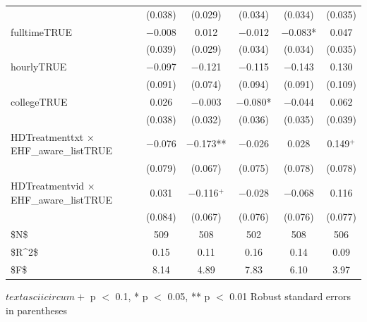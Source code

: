 \documentclass[
  11pt,
  oneside]{article}
\begin{document}
\begin{table}
\begin{threeparttable}
\begin{tabular}[t]{lccccc}
 & (\num{0.038}) & (\num{0.029}) & (\num{0.034}) & (\num{0.034}) & (\num{0.035})\\
fulltimeTRUE & \num{-0.008} & \num{0.012} & \num{-0.012} & \num{-0.083}* & \num{0.047}\\
 & (\num{0.039}) & (\num{0.029}) & (\num{0.034}) & (\num{0.034}) & (\num{0.035})\\
hourlyTRUE & \num{-0.097} & \num{-0.121} & \num{-0.115} & \num{-0.143} & \num{0.130}\\
 & (\num{0.091}) & (\num{0.074}) & (\num{0.094}) & (\num{0.091}) & (\num{0.109})\\
collegeTRUE & \num{0.026} & \num{-0.003} & \num{-0.080}* & \num{-0.044} & \num{0.062}\\
 & (\num{0.038}) & (\num{0.032}) & (\num{0.036}) & (\num{0.035}) & (\num{0.039})\\
HDTreatmenttxt × EHF\_aware\_listTRUE & \num{-0.076} & \num{-0.173}** & \num{-0.026} & \num{0.028} & \num{0.149}$^+$\\
 & (\num{0.079}) & (\num{0.067}) & (\num{0.075}) & (\num{0.078}) & (\num{0.078})\\
HDTreatmentvid × EHF\_aware\_listTRUE & \num{0.031} & \num{-0.116}$^+$ & \num{-0.028} & \num{-0.068} & \num{0.116}\\
 & (\num{0.084}) & (\num{0.067}) & (\num{0.076}) & (\num{0.076}) & (\num{0.077})\\
\midrule
\$N\$ & \num{509} & \num{508} & \num{502} & \num{508} & \num{506}\\
\$R\textasciicircum{}2\$ & \num{0.15} & \num{0.11} & \num{0.16} & \num{0.14} & \num{0.09}\\
\$F\$ & \num{8.14} & \num{4.89} & \num{7.83} & \num{6.10} & \num{3.97}\\
\bottomrule
\end{tabular}
\begin{tablenotes}
\item $textasciicircum{}+$ p $<$ 0.1, * p $<$ 0.05, ** p $<$ 0.01 Robust standard errors in parentheses
\end{tablenotes}
\end{threeparttable}
\end{table}
\end{document}
